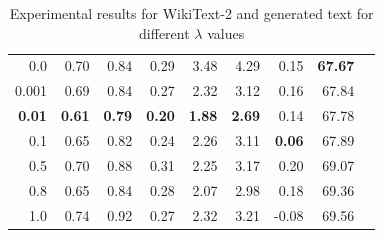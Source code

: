 \documentclass[11pt,a4paper]{article}
\begin{document}
\begin{table}[hbt!]
\begin{tabular}{rrrrrrrrr}
0.0 & 0.70 & 0.84 & 0.29 & 3.48 & 4.29 & 0.15 & \textbf{67.67} \\

0.001 & 0.69 & 0.84 & 0.27 & 2.32 & 3.12 & 0.16 & 67.84 \\

\textbf{0.01} & \textbf{0.61} & \textbf{0.79} & \textbf{0.20} & \textbf{1.88} & \textbf{2.69} & 0.14 & 67.78 \\

0.1 & 0.65 & 0.82 & 0.24 & 2.26 & 3.11 & \textbf{0.06} & 67.89 \\

0.5 & 0.70 & 0.88 & 0.31 & 2.25 & 3.17 & 0.20 & 69.07 \\

0.8 & 0.65 & 0.84 & 0.28 & 2.07 & 2.98 & 0.18 & 69.36 \\

1.0 & 0.74 & 0.92 & 0.27 & 2.32 & 3.21 & -0.08 & 69.56 \\
\bottomrule
\hline
    \end{tabular}
    \caption{Experimental results for  WikiText-2 and generated text for different $\lambda$  values}
    \label{tab:2}
\end{table}
\end{document}

